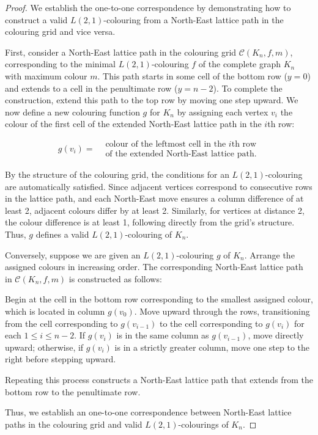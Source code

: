 \documentclass{birkjour}
\theoremstyle{definition}
\theoremstyle{remark}
\numberwithin{equation}{section}
\begin{document}
\begin{proof}
We establish the one-to-one correspondence by demonstrating how to construct a valid \( L(2,1) \)-colouring from a North-East lattice path in the colouring grid and vice versa.

First, consider a North-East lattice path in the colouring grid \( \mathcal{C}(K_n, f, m) \), corresponding to the minimal \( L(2,1) \)-colouring \( f \) of the complete graph \( K_n \) with maximum colour \( m \). This path starts in some cell of the bottom row (\( y = 0 \)) and extends to a cell in the penultimate row (\( y = n-2 \)). To complete the construction, extend this path to the top row by moving one step upward. We now define a new colouring function \( g \) for \( K_n \) by assigning each vertex \( v_i \) the colour of the first cell of the extended North-East lattice path in the \( i \)th row:

\[
g(v_i) =
\begin{aligned}
&\text{colour of the leftmost cell in the } i\text{th row} \\
&\text{of the extended North-East lattice path}.
\end{aligned}
\]

By the structure of the colouring grid, the conditions for an \( L(2,1) \)-colouring are automatically satisfied. Since adjacent vertices correspond to consecutive rows in the lattice path, and each North-East move ensures a column difference of at least 2, adjacent colours differ by at least 2. Similarly, for vertices at distance 2, the colour difference is at least 1, following directly from the grid's structure. Thus, \( g \) defines a valid \( L(2,1) \)-colouring of \( K_n \).

Conversely, suppose we are given an \( L(2,1) \)-colouring \( g \) of \( K_n \). Arrange the assigned colours in increasing order. The corresponding North-East lattice path in \( \mathcal{C}(K_n, f, m) \) is constructed as follows:

Begin at the cell in the bottom row corresponding to the smallest assigned colour, which is located in column \( g(v_0) \). Move upward through the rows, transitioning from the cell corresponding to \( g(v_{i-1}) \) to the cell corresponding to \( g(v_i) \) for each \( 1 \leq i \leq n-2 \). If \( g(v_i) \) is in the same column as \( g(v_{i-1}) \), move directly upward; otherwise, if \( g(v_i) \) is in a strictly greater column, move one step to the right before stepping upward.

Repeating this process constructs a North-East lattice path that extends from the bottom row to the penultimate row.

Thus, we establish an one-to-one correspondence between  North-East lattice paths in the colouring grid and valid \( L(2,1) \)-colourings of \( K_n \).
\end{proof}
\end{document}
